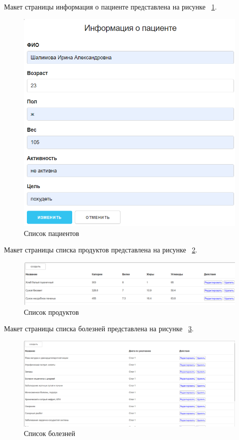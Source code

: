 Макет страницы информация о пациенте представлена на рисунке ~\ref{fig:imagein}.
\begin{figure}[H]
	\centering
	\includegraphics[width=1\linewidth]{"images/Инфа о пациенте"}
	\caption{Список пациентов}
	\label{fig:imagein}
\end{figure}

Макет страницы списка продуктов представлена на рисунке ~\ref{fig:imagepr}.
\begin{figure}[H]
	\centering
	\includegraphics[width=1\linewidth]{"images/Список продуктов"}
	\caption{Список продуктов}
	\label{fig:imagepr}
\end{figure}

Макет страницы списка болезней представлена на рисунке ~\ref{fig:imagebl}.
\begin{figure}[H]
	\centering
	\includegraphics[width=1\linewidth]{images/Болезни}
	\caption{Список болезней}
	\label{fig:imagebl}
\end{figure}

